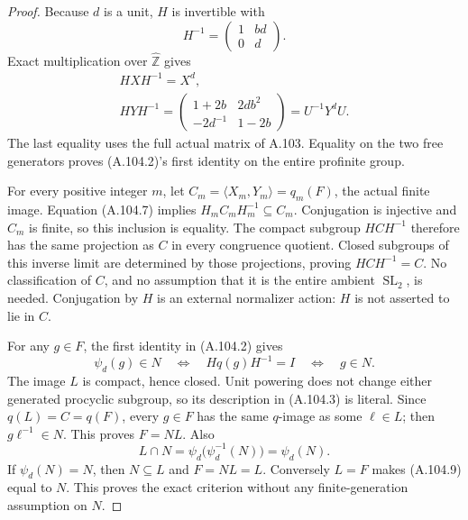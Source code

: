 \begin{proof}
Because \(d\) is a unit, \(H\) is invertible with
\[
 H^{-1}=\begin{pmatrix}1&bd\\0&d\end{pmatrix}.
 \tag{A.104.6}
\]
Exact multiplication over \(\widehat{\mathbb Z}\) gives
\[
 \begin{gathered}
 HXH^{-1}=X^d,\\
 HYH^{-1}
   =\begin{pmatrix}
        1+2b&2db^2\\-2d^{-1}&1-2b
     \end{pmatrix}
   =U^{-1}Y^dU.
 \end{gathered}
 \tag{A.104.7}
\]
The last equality uses the full actual matrix of A.103.
Equality on the two free generators proves (A.104.2)'s first
identity on the entire profinite group.

For every positive integer \(m\), let
\(C_m=\langle X_m,Y_m\rangle=q_m(F)\), the actual finite image.
Equation (A.104.7) implies
\(H_m C_mH_m^{-1}\subseteq C_m\).
Conjugation is injective and \(C_m\) is finite, so this inclusion
is equality. The compact subgroup \(HCH^{-1}\) therefore has
the same projection as \(C\) in every congruence quotient.
Closed subgroups of this inverse limit are determined by those
projections, proving \(HCH^{-1}=C\).
No classification of \(C\), and no assumption that it is the
entire ambient \(\operatorname{SL}_2\), is needed.
Conjugation by \(H\) is an external normalizer action: \(H\) is
not asserted to lie in \(C\).

For any \(g\in F\), the first identity in (A.104.2) gives
\[
 \psi_d(g)\in N
 \quad\Longleftrightarrow\quad
 Hq(g)H^{-1}=I
 \quad\Longleftrightarrow\quad g\in N.
 \tag{A.104.8}
\]
The image \(L\) is compact, hence closed.
Unit powering does not change either generated procyclic subgroup,
so its description in (A.104.3) is literal.
Since \(q(L)=C=q(F)\), every \(g\in F\) has the same \(q\)-image
as some \(\ell\in L\); then \(g\ell^{-1}\in N\).
This proves \(F=NL\).
Also
\[
 L\cap N
   =\psi_d\bigl(\psi_d^{-1}(N)\bigr)
   =\psi_d(N).
 \tag{A.104.9}
\]
If \(\psi_d(N)=N\), then \(N\subseteq L\) and \(F=NL=L\).
Conversely \(L=F\) makes (A.104.9) equal to \(N\).
This proves the exact criterion without any finite-generation
assumption on \(N\).


\end{proof}
